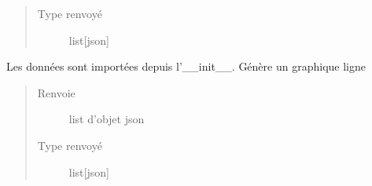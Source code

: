 \documentclass[letterpaper,10pt,french]{sphinxmanual}
\begin{document}
\begin{fulllineitems}
\begin{fulllineitems}
\begin{quote}
\begin{description}
\item[{Type renvoyé}] \leavevmode
\sphinxAtStartPar
list{[}json{]}

\end{description}\end{quote}

\end{fulllineitems}


\begin{fulllineitems}
\label{\detokenize{app.home.content_gen:app.home.content_gen.graph_generation.FinancialChart.plot_sgl_line}}
\sphinxAtStartPar
Les données sont importées depuis l’\_\_init\_\_. Génère un graphique ligne
\begin{quote}\begin{description}
\item[{Renvoie}] \leavevmode
\sphinxAtStartPar
list d’objet json

\item[{Type renvoyé}] \leavevmode
\sphinxAtStartPar
list{[}json{]}

\end{description}\end{quote}

\end{fulllineitems}


\end{fulllineitems}

\end{document}
